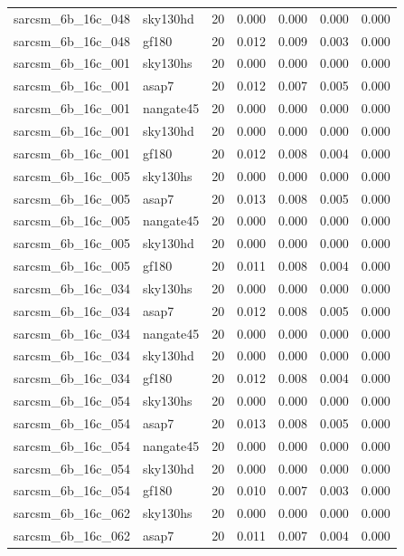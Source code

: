 \begin{tabular}{llrrrrr}
sarcsm\_6b\_16c\_048 & sky130hd & 20 & 0.000 & 0.000 & 0.000 & 0.000 \\
sarcsm\_6b\_16c\_048 & gf180 & 20 & 0.012 & 0.009 & 0.003 & 0.000 \\
sarcsm\_6b\_16c\_001 & sky130hs & 20 & 0.000 & 0.000 & 0.000 & 0.000 \\
sarcsm\_6b\_16c\_001 & asap7 & 20 & 0.012 & 0.007 & 0.005 & 0.000 \\
sarcsm\_6b\_16c\_001 & nangate45 & 20 & 0.000 & 0.000 & 0.000 & 0.000 \\
sarcsm\_6b\_16c\_001 & sky130hd & 20 & 0.000 & 0.000 & 0.000 & 0.000 \\
sarcsm\_6b\_16c\_001 & gf180 & 20 & 0.012 & 0.008 & 0.004 & 0.000 \\
sarcsm\_6b\_16c\_005 & sky130hs & 20 & 0.000 & 0.000 & 0.000 & 0.000 \\
sarcsm\_6b\_16c\_005 & asap7 & 20 & 0.013 & 0.008 & 0.005 & 0.000 \\
sarcsm\_6b\_16c\_005 & nangate45 & 20 & 0.000 & 0.000 & 0.000 & 0.000 \\
sarcsm\_6b\_16c\_005 & sky130hd & 20 & 0.000 & 0.000 & 0.000 & 0.000 \\
sarcsm\_6b\_16c\_005 & gf180 & 20 & 0.011 & 0.008 & 0.004 & 0.000 \\
sarcsm\_6b\_16c\_034 & sky130hs & 20 & 0.000 & 0.000 & 0.000 & 0.000 \\
sarcsm\_6b\_16c\_034 & asap7 & 20 & 0.012 & 0.008 & 0.005 & 0.000 \\
sarcsm\_6b\_16c\_034 & nangate45 & 20 & 0.000 & 0.000 & 0.000 & 0.000 \\
sarcsm\_6b\_16c\_034 & sky130hd & 20 & 0.000 & 0.000 & 0.000 & 0.000 \\
sarcsm\_6b\_16c\_034 & gf180 & 20 & 0.012 & 0.008 & 0.004 & 0.000 \\
sarcsm\_6b\_16c\_054 & sky130hs & 20 & 0.000 & 0.000 & 0.000 & 0.000 \\
sarcsm\_6b\_16c\_054 & asap7 & 20 & 0.013 & 0.008 & 0.005 & 0.000 \\
sarcsm\_6b\_16c\_054 & nangate45 & 20 & 0.000 & 0.000 & 0.000 & 0.000 \\
sarcsm\_6b\_16c\_054 & sky130hd & 20 & 0.000 & 0.000 & 0.000 & 0.000 \\
sarcsm\_6b\_16c\_054 & gf180 & 20 & 0.010 & 0.007 & 0.003 & 0.000 \\
sarcsm\_6b\_16c\_062 & sky130hs & 20 & 0.000 & 0.000 & 0.000 & 0.000 \\
sarcsm\_6b\_16c\_062 & asap7 & 20 & 0.011 & 0.007 & 0.004 & 0.000 \\

\end{tabular}
